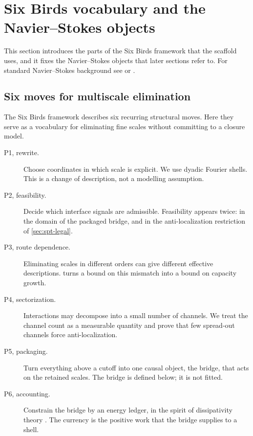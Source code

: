 \section{Six Birds vocabulary and the Navier--Stokes objects}
\label{sec:six_primitives_mapping}

This section introduces the parts of the Six Birds framework \citep{tsiokos_2026_18365949} that the
scaffold uses, and it fixes the Navier--Stokes objects that later sections refer to. For standard
Navier--Stokes background see \citet{temam_ns} or \citet{majda_bertozzi_vif}.

\subsection{Six moves for multiscale elimination}
\label{sec:six_primitives_recap}

The Six Birds framework describes six recurring structural moves. Here they serve as a vocabulary
for eliminating fine scales without committing to a closure model.

\begin{description}
\item[P1, rewrite.] Choose coordinates in which scale is explicit. We use dyadic Fourier shells.
This is a change of description, not a modelling assumption.
\item[P2, feasibility.] Decide which interface signals are admissible. Feasibility appears twice:
in the domain of the packaged bridge, and in the anti-localization restriction of
\cref{sec:spt-legal}.
\item[P3, route dependence.] Eliminating scales in different orders can give different effective
descriptions.  turns a bound on this mismatch into a bound on capacity
growth.
\item[P4, sectorization.] Interactions may decompose into a small number of channels. We treat the
channel count as a measurable quantity and prove that few spread-out channels force
anti-localization.
\item[P5, packaging.] Turn everything above a cutoff into one causal object, the bridge, that acts
on the retained scales. The bridge is defined below; it is not fitted.
\item[P6, accounting.] Constrain the bridge by an energy ledger, in the spirit of dissipativity
theory \citep{willems1972dissipative1}. The currency is the positive work that the bridge supplies
to a shell.
\end{description}

